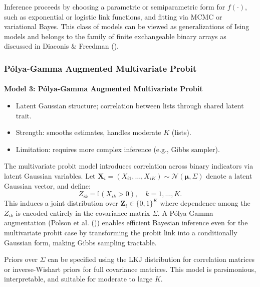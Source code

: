 \documentclass[
  12pt,
]{article}
\makeatletter
\let\oldparagraph\paragraph
\renewcommand{\paragraph}{
    \@ifstar
      \xxxParagraphStar
      \xxxParagraphNoStar
  }
\newcommand{\xxxParagraphStar}[1]{\oldparagraph*{#1}\mbox{}}
\newcommand{\xxxParagraphNoStar}[1]{\oldparagraph{#1}\mbox{}}
\providecommand{\tightlist}{%
  \setlength{\itemsep}{0pt}\setlength{\parskip}{0pt}}\usepackage{longtable,booktabs,array}
\theoremstyle{plain}
\theoremstyle{definition}
\makeatother
\begin{document}
Inference proceeds by choosing a parametric or semiparametric form for
\(f(\cdot)\), such as exponential or logistic link functions, and
fitting via MCMC or variational Bayes. This class of models can be
viewed as generalizations of Ising models and belongs to the family of
finite exchangeable binary arrays as discussed in Diaconis \& Freedman
().

\subsubsection{Pólya-Gamma Augmented Multivariate
Probit}\label{puxf3lya-gamma-augmented-multivariate-probit}

\paragraph{\texorpdfstring{\textbf{Model 3: Pólya-Gamma Augmented
Multivariate
Probit}}{Model 3: Pólya-Gamma Augmented Multivariate Probit}}\label{model-3-puxf3lya-gamma-augmented-multivariate-probit}

\begin{itemize}
\tightlist
\item
  Latent Gaussian structure; correlation between lists through shared
  latent trait.
\item
  Strength: smooths estimates, handles moderate \(K\) (lists).
\item
  Limitation: requires more complex inference (e.g., Gibbs sampler).
\end{itemize}

The multivariate probit model introduces correlation across binary
indicators via latent Gaussian variables. Let
\(\mathbf{X}_i = (X_{i1}, \ldots, X_{iK}) \sim \mathcal{N}(\boldsymbol{\mu}, \Sigma)\)
denote a latent Gaussian vector, and define: \[
Z_{ik} = \mathbb{I}(X_{ik} > 0), \quad k = 1, \ldots, K.
\] This induces a joint distribution over \(\mathbf{Z}_i \in \{0,1\}^K\)
where dependence among the \(Z_{ik}\) is encoded entirely in the
covariance matrix \(\Sigma\). A Pólya-Gamma augmentation (Polson et al.
()) enables efficient Bayesian
inference even for the multivariate probit case by transforming the
probit link into a conditionally Gaussian form, making Gibbs sampling
tractable.

Priors over \(\Sigma\) can be specified using the LKJ distribution for
correlation matrices or inverse-Wishart priors for full covariance
matrices. This model is parsimonious, interpretable, and suitable for
moderate to large \(K\).
\end{document}
